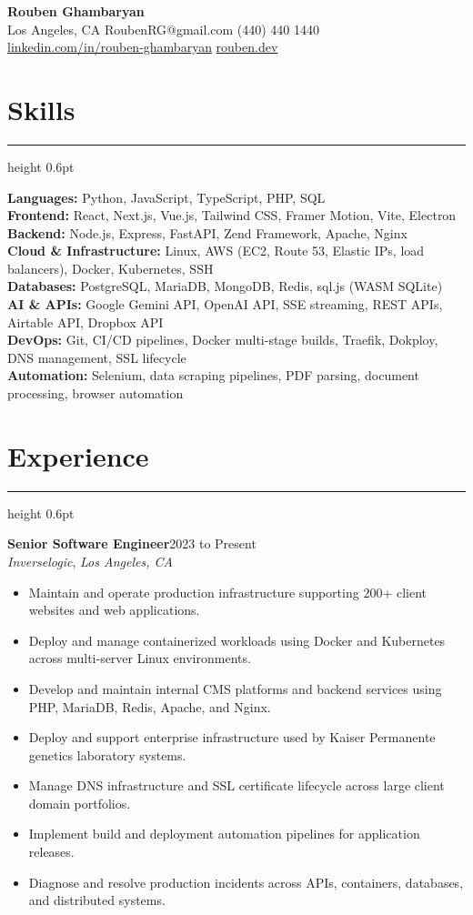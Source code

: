 \documentclass[10pt,letterpaper]{article}
\newcommand{\resheading}[1]{%
  \section*{#1}
  \vspace{-0.4em}\hrule height 0.6pt \vspace{0.45em}
}
\newcommand{\roleline}[4]{%
  {\bfseries #1}\hfill #2\\
  {\itshape #3}\if\relax\detokenize{#4}\relax\else, {\itshape #4}\fi\\
}
\begin{document}
\begin{center}
    {\fontsize{22}{24}\selectfont\bfseries Rouben Ghambaryan}\\[5pt]
    Los Angeles, CA \textbullet{} RoubenRG@gmail.com \textbullet{} (440) 440 1440\\[3pt]
    \href{https://www.linkedin.com/in/rouben-ghambaryan/}{linkedin.com/in/rouben-ghambaryan} \textbullet{} \href{https://rouben.dev}{rouben.dev}
\end{center}

\resheading{Skills}

\textbf{Languages:} Python, JavaScript, TypeScript, PHP, SQL \\[3pt]
\textbf{Frontend:} React, Next.js, Vue.js, Tailwind CSS, Framer Motion, Vite, Electron \\[3pt]
\textbf{Backend:} Node.js, Express, FastAPI, Zend Framework, Apache, Nginx \\[3pt]
\textbf{Cloud \& Infrastructure:} Linux, AWS (EC2, Route 53, Elastic IPs, load balancers), Docker, Kubernetes, SSH \\[3pt]
\textbf{Databases:} PostgreSQL, MariaDB, MongoDB, Redis, sql.js (WASM SQLite) \\[3pt]
\textbf{AI \& APIs:} Google Gemini API, OpenAI API, SSE streaming, REST APIs, Airtable API, Dropbox API \\[3pt]
\textbf{DevOps:} Git, CI/CD pipelines, Docker multi-stage builds, Traefik, Dokploy, DNS management, SSL lifecycle \\[3pt]
\textbf{Automation:} Selenium, data scraping pipelines, PDF parsing, document processing, browser automation

\resheading{Experience}

\roleline{Senior Software Engineer}{2023 to Present}{Inverselogic}{Los Angeles, CA}
\begin{itemize}
    \item Maintain and operate production infrastructure supporting 200+ client websites and web applications.
    \item Deploy and manage containerized workloads using Docker and Kubernetes across multi-server Linux environments.
    \item Develop and maintain internal CMS platforms and backend services using PHP, MariaDB, Redis, Apache, and Nginx.
    \item Deploy and support enterprise infrastructure used by Kaiser Permanente genetics laboratory systems.
    \item Manage DNS infrastructure and SSL certificate lifecycle across large client domain portfolios.
    \item Implement build and deployment automation pipelines for application releases.
    \item Diagnose and resolve production incidents across APIs, containers, databases, and distributed systems.
\end{itemize}
\end{document}

